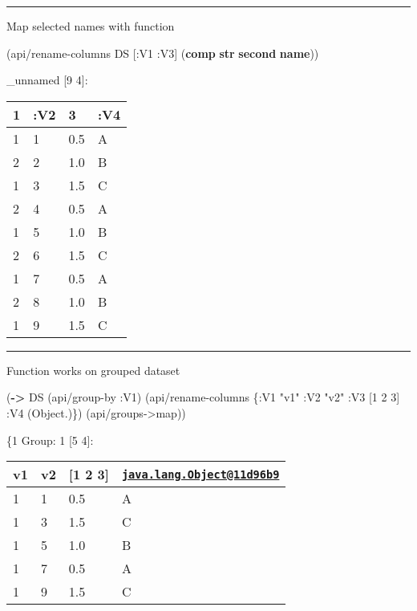 \documentclass[]{article}
\newenvironment{Shaded}{\begin{snugshade}}{\end{snugshade}}
\newcommand{\AttributeTok}[1]{\textcolor[rgb]{0.77,0.63,0.00}{#1}}
\newcommand{\DecValTok}[1]{\textcolor[rgb]{0.00,0.00,0.81}{#1}}
\newcommand{\KeywordTok}[1]{\textcolor[rgb]{0.13,0.29,0.53}{\textbf{#1}}}
\newcommand{\NormalTok}[1]{#1}
\newcommand{\StringTok}[1]{\textcolor[rgb]{0.31,0.60,0.02}{#1}}
\begin{document}
\begin{center}\rule{0.5\linewidth}{0.5pt}\end{center}

Map selected names with function

\begin{Shaded}
\begin{Highlighting}[]
\NormalTok{(api/rename-columns DS [}\AttributeTok{:V1} \AttributeTok{:V3}\NormalTok{] (}\KeywordTok{comp} \KeywordTok{str} \KeywordTok{second} \KeywordTok{name}\NormalTok{))}
\end{Highlighting}
\end{Shaded}

\_unnamed {[}9 4{]}:

\begin{longtable}[]{@{}llll@{}}
\toprule
1 & :V2 & 3 & :V4\tabularnewline
\midrule
\endhead
1 & 1 & 0.5 & A\tabularnewline
2 & 2 & 1.0 & B\tabularnewline
1 & 3 & 1.5 & C\tabularnewline
2 & 4 & 0.5 & A\tabularnewline
1 & 5 & 1.0 & B\tabularnewline
2 & 6 & 1.5 & C\tabularnewline
1 & 7 & 0.5 & A\tabularnewline
2 & 8 & 1.0 & B\tabularnewline
1 & 9 & 1.5 & C\tabularnewline
\bottomrule
\end{longtable}

\begin{center}\rule{0.5\linewidth}{0.5pt}\end{center}

Function works on grouped dataset

\begin{Shaded}
\begin{Highlighting}[]
\NormalTok{(}\KeywordTok{->}\NormalTok{ DS}
\NormalTok{    (api/group-by }\AttributeTok{:V1}\NormalTok{)}
\NormalTok{    (api/rename-columns \{}\AttributeTok{:V1} \StringTok{"v1"}
                         \AttributeTok{:V2} \StringTok{"v2"}
                         \AttributeTok{:V3}\NormalTok{ [}\DecValTok{1} \DecValTok{2} \DecValTok{3}\NormalTok{]}
                         \AttributeTok{:V4}\NormalTok{ (Object.)\})}
\NormalTok{    (api/groups->map))}
\end{Highlighting}
\end{Shaded}

\{1 Group: 1 {[}5 4{]}:

\begin{longtable}[]{@{}llll@{}}
\toprule
v1 & v2 & {[}1 2 3{]} &
\href{mailto:java.lang.Object@11d96b9}{\nolinkurl{java.lang.Object@11d96b9}}\tabularnewline
\midrule
\endhead
1 & 1 & 0.5 & A\tabularnewline
1 & 3 & 1.5 & C\tabularnewline
1 & 5 & 1.0 & B\tabularnewline
1 & 7 & 0.5 & A\tabularnewline
1 & 9 & 1.5 & C\tabularnewline
\bottomrule
\end{longtable}
\end{document}
